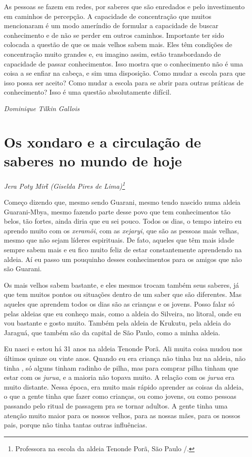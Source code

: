 As pessoas se fazem em redes, por saberes que são enredados e pelo
investimento em caminhos de percepção. A capacidade de concentração que
muitos mencionaram é um modo ameríndio de formular a capacidade de
buscar conhecimento e de não se perder em outros caminhos. Importante
ter sido colocada a questão de que os mais velhos sabem mais. Eles têm
condições de concentração muito grandes e, eu imagino assim, estão
transbordando de capacidade de passar conhecimentos. Isso mostra que o
conhecimento não é uma coisa a se enfiar na cabeça, e sim uma
disposição. Como mudar a escola para que isso possa ser aceito? Como
mudar a escola para se abrir para outras práticas de conhecimento? Isso
é uma questão absolutamente difícil.
\bigskip
\begin{flushright}
\emph{Dominique Tilkin Gallois}
\end{flushright}


\chapter{Os xondaro e a circulação de saberes no mundo de hoje}
\begin{flushright}
\emph{Jera Poty Mirῖ (Giselda Pires de Lima)\footnote{Professora na escola da aldeia Tenonde Porã, São Paulo /.}}
\end{flushright}  

Começo dizendo que, mesmo sendo Guarani, mesmo tendo nascido numa aldeia
Guarani-Mbya, mesmo fazendo parte desse povo que tem conhecimentos tão
belos, tão fortes, ainda diria que eu sei pouco. Todos os dias, o tempo
inteiro eu aprendo muito com os \emph{xeramõi}, com as \emph{xejaryi}, que são as
pessoas mais velhas, mesmo que não sejam líderes espirituais. De fato,
aqueles que têm mais idade sempre sabem mais e eu fico muito feliz de
estar constantemente aprendendo na aldeia. Aí eu passo um pouquinho
desses conhecimentos para os amigos que não são Guarani.

Os mais velhos sabem bastante, e eles mesmos trocam também seus saberes,
já que tem muitos pontos ou situações dentro de um saber que são
diferentes. Mas aqueles que aprendem todos os dias são as crianças e os
jovens. Posso falar só pelas aldeias que eu conheço mais, como a aldeia
do Silveira, no litoral, onde eu vou bastante e gosto muito. Também
pela aldeia de Krukutu, pela aldeia do Jaraguá, que também são da
capital de São Paulo, como a minha aldeia.

Eu nasci e estou há 31 anos na aldeia Tenonde Porã. Ali muita coisa
mudou nos últimos quinze ou vinte anos. Quando eu era criança não tinha
luz na aldeia, não tinha , só alguns tinham radinho de pilha, mas
para comprar pilha tinham que estar com os \emph{jurua}, e a maioria não
topava muito. A relação com os \emph{jurua} era muito distante. Nessa época,
era muito mais rápido aprender as coisas da aldeia, o que a gente tinha
que fazer como crianças, ou como jovens, ou como pessoas passando pelo
ritual de passagem pra se tornar adultos. A gente tinha uma atenção
muito maior para os nossos velhos, para as nossas mães, para os nossos
pais, porque não tinha tantas outras influências.

